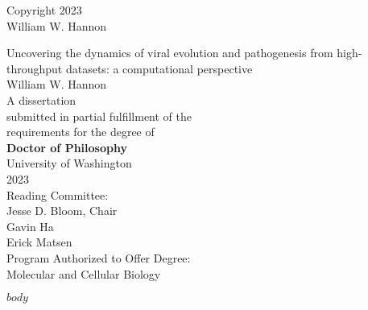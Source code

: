 \documentclass[12pt,oneside,letterpaper]{report}
\begin{document}
\thispagestyle{empty}
\begin{center}
\textcopyright{} Copyright 2023 \\
William W. Hannon
\end{center}
\vspace*{\fill}
\newpage

\begin{singlespace}
\thispagestyle{empty}
\begin{center}
\huge{Uncovering the dynamics of viral evolution and pathogenesis from high-throughput datasets: a computational perspective} \\
\vspace{2cm}
\Large{William W. Hannon} \\
\vspace{2cm}
A dissertation \\
submitted in partial fulfillment of the \\
requirements for the degree of \\
\vspace{1cm}
\textbf{Doctor of Philosophy} \\
\vspace{1cm}
University of Washington \\
2023 \\
\vspace{1cm}
Reading Committee: \\
Jesse D. Bloom, Chair \\
Gavin Ha \\
Erick Matsen \\
\vspace{1cm}
Program Authorized to Offer Degree: \\
Molecular and Cellular Biology
\end{center}
\end{singlespace}
\newpage


\newpage

\tableofcontents
\newpage

\listoffigures
\newpage


\newpage

$body$
\newpage



\end{document}
